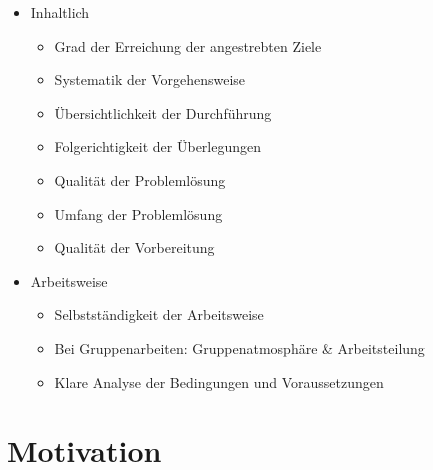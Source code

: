 \documentclass[xcolor=dvipsnames,aspectratio=169]{beamer}
\begin{document}
\begin{frame}
	\begin{itemize}
		\item Inhaltlich
		\begin{itemize}
			\item Grad der Erreichung der angestrebten Ziele 
			\item Systematik der Vorgehensweise 
			\item Übersichtlichkeit der Durchführung 
			\item Folgerichtigkeit der Überlegungen 
			\item Qualität der Problemlösung 
			\item Umfang der Problemlösung 
			\item Qualität der Vorbereitung 
		\end{itemize}
		\item Arbeitsweise
		\begin{itemize}
			\item Selbstständigkeit der Arbeitsweise 
			\item Bei Gruppenarbeiten: Gruppenatmosphäre \& Arbeitsteilung
			\item Klare Analyse der Bedingungen und Voraussetzungen
		\end{itemize}
	\end{itemize}
\end{frame}

\section{Motivation}
\end{document}
